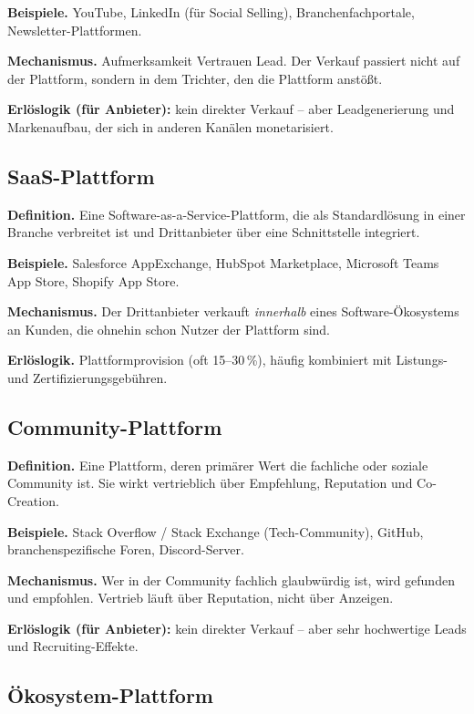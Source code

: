 \documentclass[11pt,a4paper,oneside]{article}
\begin{document}
\textbf{Beispiele.} YouTube, LinkedIn (für Social Selling), Branchenfachportale, Newsletter-Plattformen.

\textbf{Mechanismus.} Aufmerksamkeit \textrightarrow{} Vertrauen \textrightarrow{} Lead. Der Verkauf passiert nicht auf der Plattform, sondern in dem Trichter, den die Plattform anstößt.

\textbf{Erlöslogik (für Anbieter):} kein direkter Verkauf -- aber Leadgenerierung und Markenaufbau, der sich in anderen Kanälen monetarisiert.

\subsection{SaaS-Plattform}

\textbf{Definition.} Eine Software-as-a-Service-Plattform, die als Standardlösung in einer Branche verbreitet ist und Drittanbieter über eine Schnittstelle integriert.

\textbf{Beispiele.} Salesforce AppExchange, HubSpot Marketplace, Microsoft Teams App Store, Shopify App Store.

\textbf{Mechanismus.} Der Drittanbieter verkauft \emph{innerhalb} eines Software-Ökosystems an Kunden, die ohnehin schon Nutzer der Plattform sind.

\textbf{Erlöslogik.} Plattformprovision (oft 15--30\,\%), häufig kombiniert mit Listungs- und Zertifizierungsgebühren.

\subsection{Community-Plattform}

\textbf{Definition.} Eine Plattform, deren primärer Wert die fachliche oder soziale Community ist. Sie wirkt vertrieblich über Empfehlung, Reputation und Co-Creation.

\textbf{Beispiele.} Stack Overflow / Stack Exchange (Tech-Community), GitHub, branchenspezifische Foren, Discord-Server.

\textbf{Mechanismus.} Wer in der Community fachlich glaubwürdig ist, wird gefunden und empfohlen. Vertrieb läuft über Reputation, nicht über Anzeigen.

\textbf{Erlöslogik (für Anbieter):} kein direkter Verkauf -- aber sehr hochwertige Leads und Recruiting-Effekte.

\subsection{Ökosystem-Plattform}
\end{document}
